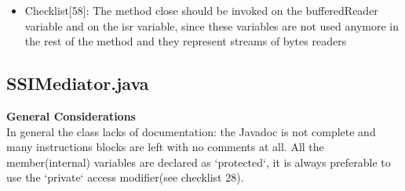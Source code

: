 \documentclass[11pt,titlepage]{article} %
\begin{document}
\begin{itemize}
\begin{itemize}
     \item Checklist[58]:
      The method close should be invoked on the bufferedReader variable and on the
      isr variable, since these variables are not used anymore in the rest of the method
      and they represent streams of bytes readers
      

    \end{itemize}

  \end{itemize}


\subsection{SSIMediator.java}
  \textbf{General Considerations} \hfill \\
  In general the class lacks of documentation: the Javadoc is not complete and many instructions blocks are left with no comments at all.\newline
  All the member(internal) variables are declared as `protected`, it is always preferable to use the `private` access modifier(see checklist 28). 
\end{document}
